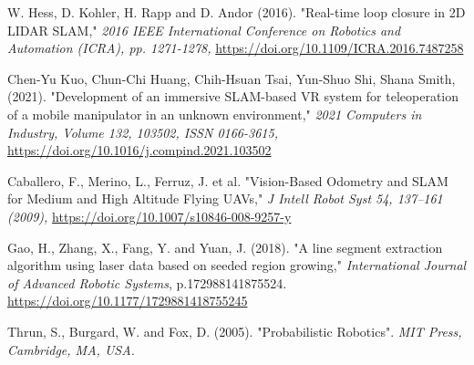 \documentclass[12pt]{article}
\begin{document}
\begin{thebibliography}{9}
    W. Hess, D. Kohler, H. Rapp and D. Andor (2016). "Real-time loop closure in 2D LIDAR SLAM,"
    \textit{2016 IEEE International Conference on Robotics and Automation (ICRA), pp. 1271-1278,}
    \href{https://doi.org/10.1109/ICRA.2016.7487258}{https://doi.org/10.1109/ICRA.2016.7487258}

    Chen-Yu Kuo, Chun-Chi Huang, Chih-Hsuan Tsai, Yun-Shuo Shi, Shana Smith, (2021). "Development of an immersive SLAM-based VR system for teleoperation of a mobile manipulator in an unknown environment,"
    \textit{2021 Computers in Industry, Volume 132, 103502, ISSN 0166-3615,}
    \href{https://doi.org/10.1016/j.compind.2021.103502}{https://doi.org/10.1016/j.compind.2021.103502}

    Caballero, F., Merino, L., Ferruz, J. et al. "Vision-Based Odometry and SLAM for Medium and High Altitude Flying UAVs,"
    \textit{J Intell Robot Syst 54, 137–161 (2009),}
    \href{https://doi.org/10.1007/s10846-008-9257-y}{https://doi.org/10.1007/s10846-008-9257-y}

    Gao, H., Zhang, X., Fang, Y. and Yuan, J. (2018). "A line segment extraction algorithm using laser data based on seeded region growing,"
    \textit{International Journal of Advanced Robotic Systems}, p.172988141875524.
    \href{https://doi.org/10.1177/1729881418755245}{https://doi.org/10.1177/1729881418755245}

    Thrun, S., Burgard, W. and Fox, D. (2005). "Probabilistic Robotics".
    \textit{MIT Press, Cambridge, MA, USA.}

\end{thebibliography}
\end{document}
